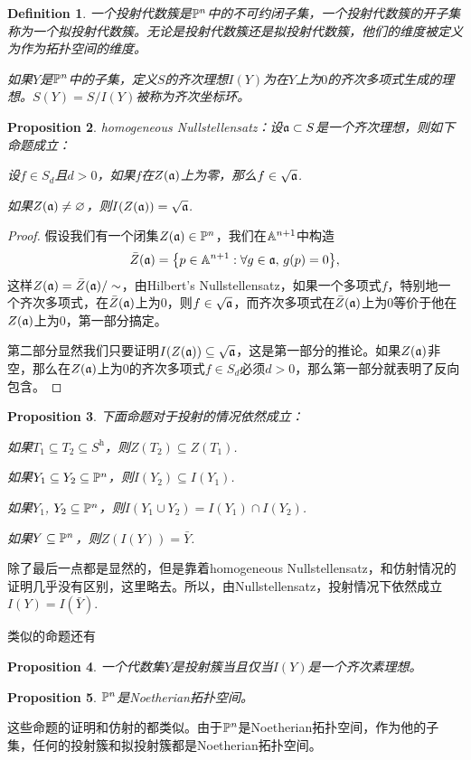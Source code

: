 \documentclass[9pt]{extbook}
\theoremstyle{plain}%
\newtheorem{defi}{Definition}[section]%
\newtheorem{pro}[defi]{Proposition}%
\begin{document}
\begin{defi}
	一个投射代数簇是$\mathbb{P}^n$中的不可约闭子集，一个投射代数簇的开子集称为一个拟投射代数簇。无论是投射代数簇还是拟投射代数簇，他们的维度被定义为作为拓扑空间的维度。

	如果$Y$是$\mathbb{P}^n$中的子集，定义$S$的齐次理想$I(Y)$为在$Y$上为$0$的齐次多项式生成的理想。$S(Y)=S/I(Y)$被称为齐次坐标环。
\end{defi}

\begin{pro}
homogeneous Nullstellensatz：设$\mathfrak{a}\subset S$是一个齐次理想，则如下命题成立：

 设$f\in S_d$且$d>0$，如果$f$在$Z(\mathfrak{a})$上为零，那么$f \in \sqrt{\mathfrak{a}}$.

 如果$Z(\mathfrak{a})\neq \varnothing$，则$I(Z(\mathfrak{a}))=\sqrt{\mathfrak{a}}$.
\end{pro}
\begin{proof}
	假设我们有一个闭集$Z(\mathfrak{a})\in \mathbb{P}^n$，我们在$\mathbb{A}^{n+1}$中构造
	\[
		\bar{Z}(\mathfrak{a})=\bigl\{p\in \mathbb{A}^{n+1}:\forall g\in \mathfrak{a},\, g(p)=0\bigr\},
	\]
	这样$Z(\mathfrak{a})=\bar{Z}(\mathfrak{a})/\sim$，由Hilbert's Nullstellensatz，如果一个多项式$f$，特别地一个齐次多项式，在$\bar{Z}(\mathfrak{a})$上为$0$，则$f\in \sqrt{\mathfrak{a}}$，而齐次多项式在$\bar{Z}(\mathfrak{a})$上为$0$等价于他在$Z(\mathfrak{a})$上为$0$，第一部分搞定。

	第二部分显然我们只要证明$I(Z(\mathfrak{a}))\subseteq \sqrt{\mathfrak{a}}$，这是第一部分的推论。如果$Z(\mathfrak{a})$非空，那么在$Z(\mathfrak{a})$上为$0$的齐次多项式$f\in S_d$必须$d>0$，那么第一部分就表明了反向包含。
\end{proof}

\begin{pro}
	下面命题对于投射的情况依然成立：

	 如果$T_1\subseteq T_2 \subseteq S^{\mathrm{h}}$，则$Z(T_2)\subseteq Z(T_1)$.

	 如果$Y_1\subseteq Y_2 \subseteq \mathbb{P}^n$，则$I(Y_2)\subseteq I(Y_1)$.

	 如果$Y_1$, $Y_2 \subseteq \mathbb{P}^n$，则$I(Y_1\cup Y_2)=I(Y_1)\cap I(Y_2)$.

	 如果$Y \subseteq \mathbb{P}^n$，则$Z(I(Y))=\bar{Y}$.
\end{pro}
除了最后一点都是显然的，但是靠着homogeneous Nullstellensatz，和仿射情况的证明几乎没有区别，这里略去。所以，由Nullstellensatz，投射情况下依然成立$I(Y)=I(\bar{Y})$.

类似的命题还有
\begin{pro}
	一个代数集$Y$是投射簇当且仅当$I(Y)$是一个齐次素理想。
\end{pro}
\begin{pro}
	$\mathbb{P}^n$是Noetherian拓扑空间。
\end{pro}
这些命题的证明和仿射的都类似。由于$\mathbb{P}^n$是Noetherian拓扑空间，作为他的子集，任何的投射簇和拟投射簇都是Noetherian拓扑空间。
\end{document}
